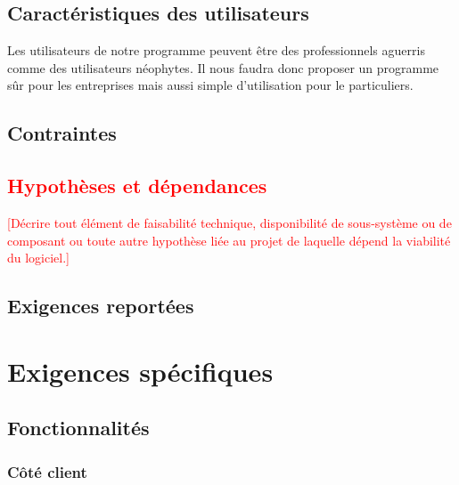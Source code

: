 \documentclass[10pt,a4paper]{report}
\begin{document}
\subsection{Caractéristiques des utilisateurs}
Les utilisateurs de notre programme peuvent être des professionnels aguerris comme des utilisateurs néophytes. Il nous faudra donc proposer un programme sûr pour les entreprises mais aussi simple d'utilisation pour le particuliers.

\subsection{Contraintes}

\textcolor{red}{\subsection{Hypothèses et dépendances}
[Décrire tout élément de faisabilité technique, disponibilité de sous-système ou de composant ou toute autre hypothèse liée au projet de laquelle dépend la viabilité du logiciel.]}

\subsection{Exigences reportées}

\section{Exigences spécifiques}

\subsection{Fonctionnalités}

\subsubsection{Côté client}
\end{document}
